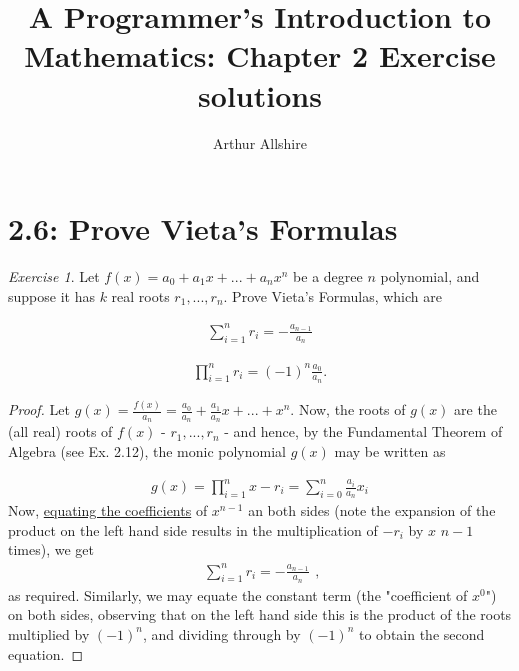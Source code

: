 \documentclass{article}
\author{Arthur Allshire}
\title{A Programmer's Introduction to Mathematics: Chapter 2 Exercise solutions}
\theoremstyle{remark}
\newtheorem*{exercise}{Exercise}
\begin{document}
\maketitle

\section*{2.6: Prove Vieta's Formulas}
\begin{exercise}
Let $f(x) = a_0 + a_1x + ... + a_nx^n$ be a degree $n$ polynomial, and suppose
it has $k$ real roots $r_1, ..., r_n$. Prove Vieta's Formulas, which are
\end{exercise}

\[
\begin{aligned}
\displaystyle\sum_{i=1}^{n} r_i = -\frac{a_{n-1}}{a_n}
\end{aligned}
\]

\[
\begin{aligned}
\displaystyle\prod_{i=1}^{n} r_i = (-1)^n \frac{a_0}{a_n}.
\end{aligned}
\]

\begin{proof}

Let $g(x) = \frac{f(x)}{a_n} = \frac{a_0}{a_n} + \frac{a_1}{a_n}x + ... + x^n$.
Now, the roots of $g(x)$ are the (all real) roots of $f(x)$ - $r_1,...,r_n$ -
and hence, by the Fundamental Theorem of Algebra (see Ex. 2.12), the monic polynomial
$g(x)$ may be written as

\[
\begin{aligned}
g(x) = \displaystyle\prod_{i=1}^{n} x - r_i = \displaystyle\sum_{i=0}^{n} \frac{a_i}{a_n} x_i
\end{aligned}
\]
Now, \href{https://en.wikipedia.org/wiki/Equating_coefficients}{equating the coefficients}
of $x^{n-1}$ an both sides (note the expansion of the product on the left hand
side results in the multiplication of $-r_i$ by $x$ $n-1$ times), we get
\[
\begin{aligned}
\displaystyle\sum_{i=1}^{n} r_i = -\frac{a_{n-1}}{a_n}
\end{aligned},
\]as required.
Similarly, we may equate the constant term (the "coefficient of $x^0$") on both sides,
observing that on the left hand side this is the product of the roots multiplied by $(-1)^n$, and
dividing through by $(-1)^n$ to obtain the second equation.

\end{proof}
\end{document}
